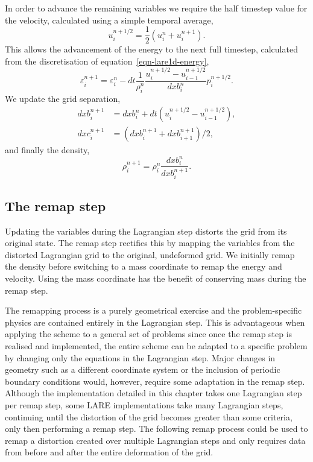 In order to advance the remaining variables we require the half timestep value for the velocity, calculated using a simple temporal average,
\begin{equation}
  u_i^{n+1/2} = \frac{1}{2}(u_i^{n} + u_i^{n+1}).
  \label{}
\end{equation}
This allows the advancement of the energy to the next full timestep, calculated from the discretisation of equation~\eqref{eqn-lare1d-energy},
\begin{equation}
  \varepsilon_i^{n+1} = \varepsilon_i^{n} - dt \frac{1}{\rho_i^n} \frac{u_i^{n+1/2} - u_{i-1}^{n+1/2}}{ dxb_i^n}p_i^{n+1/2}.
  \label{}
\end{equation}
We update the grid separation,
\begin{align}
  dxb_i^{n+1} &=  dxb_i^n + dt(u_i^{n+1/2} - u_{i-1}^{n+1/2}),\\
  dxc_i^{n+1} &=  (dxb_i^{n+1} + dxb_{i+1}^{n+1})/2,
  \label{eqn-lagrangian-grid-update}
\end{align}
and finally the density,
\begin{equation}
  \rho_i^{n+1} = \rho_i^n \frac{dxb_i^n}{dxb_i^{n+1}}.
  \label{}
\end{equation}

\subsection{The remap step}
Updating the variables during the Lagrangian step distorts the grid from its original state. The remap step rectifies this by mapping the variables from the distorted Lagrangian grid to the original, undeformed grid. We initially remap the density before switching to a mass coordinate to remap the energy and velocity. Using the mass coordinate has the benefit of conserving mass during the remap step.

The remapping process is a purely geometrical exercise and the problem-specific physics are contained entirely in the Lagrangian step. This is advantageous when applying the scheme to a general set of problems since once the remap step is realised and implemented, the entire scheme can be adapted to a specific problem by changing only the equations in the Lagrangian step. Major changes in geometry such as a different coordinate system or the inclusion of periodic boundary conditions would, however, require some adaptation in the remap step. Although the implementation detailed in this chapter takes one Lagrangian step per remap step, some LARE implementations take many Lagrangian steps, continuing until the distortion of the grid becomes greater than some criteria, only then performing a remap step. The following remap process could be used to remap a distortion created over multiple Lagrangian steps and only requires data from before and after the entire deformation of the grid. 

